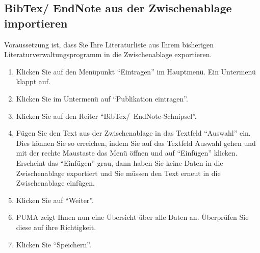 \subsection{BibTex/ EndNote aus der Zwischenablage importieren}
Voraussetzung ist, dass Sie Ihre Literaturliste aus Ihrem bisherigen Literaturverwaltungsprogramm in die Zwischenablage exportieren.
\begin{enumerate}
    \item Klicken Sie auf den Menüpunkt \enquote{Eintragen} im Hauptmenü. Ein Untermenü klappt auf.
    \item Klicken Sie im Untermenü auf \enquote{Publikation eintragen}.
    \item Klicken Sie auf den Reiter \enquote{BibTex/~EndNote-Schnipsel}.
    \item Fügen Sie den Text aus der Zwischenablage in das Textfeld \enquote{Auswahl} ein. Dies können Sie so erreichen, indem Sie auf das Textfeld Auswahl gehen und mit der rechte Maustaste das Menü öffnen und auf \enquote{Einfügen} klicken. Erscheint das \enquote{Einfügen} grau, dann haben Sie keine Daten in die Zwischenablage exportiert und Sie müssen den Text erneut in die Zwischenablage einfügen.
    \item Klicken Sie auf \enquote{Weiter}.
    \item PUMA zeigt Ihnen nun eine Übersicht über alle Daten an. Überprüfen Sie diese auf ihre Richtigkeit.
    \item Klicken Sie \enquote{Speichern}.
\end{enumerate}

